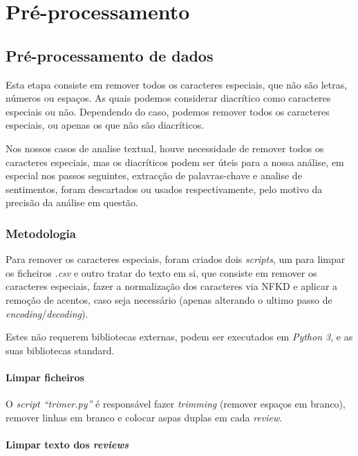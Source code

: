 \chapter{Pré-processamento}
\label{cap4}

\section{Pré-processamento de dados}

Esta etapa consiste em remover todos os caracteres especiais, que não são letras, números ou espaços. As quais podemos considerar diacrítico como caracteres especiais ou não. Dependendo do caso, podemos remover todos os caracteres especiais, ou apenas os que não são diacríticos.

Nos nossos casos de analise textual, houve necessidade de remover todos os caracteres especiais, mas os diacríticos podem ser úteis para a nossa análise, em especial nos passos seguintes, extracção de palavras-chave e analise de sentimentos, foram descartados ou usados respectivamente, pelo motivo da precisão da análise em questão.

\subsection{Metodologia}

Para remover os caracteres especiais, foram criados dois \textit{scripts}, um para limpar os ficheiros \textit{.csv} e outro tratar do texto em si, que consiste em remover os caracteres especiais, fazer a normalização dos caracteres via NFKD e aplicar a remoção de acentos, caso seja necessário (apenas alterando o ultimo passo de \textit{encoding}/\textit{decoding}).

Estes não requerem bibliotecas externas, podem ser executados em \textit{Python 3}, e as suas bibliotecas standard.

\subsubsection{Limpar ficheiros}

O \textit{script ``trimer.py''} é responsável fazer \textit{trimming} (remover espaços em branco), remover linhas em branco e colocar aspas duplas em cada \textit{review}.

\subsubsection{Limpar texto dos \textit{reviews}}

